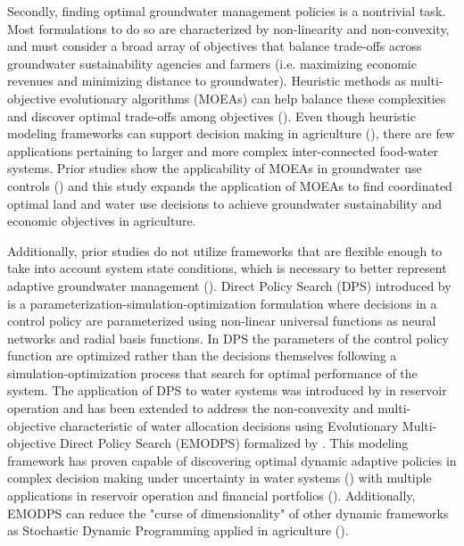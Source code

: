 \documentclass[11pt,a4paper]{article}
\begin{document}
Secondly, finding optimal groundwater management policies is a nontrivial task. Most formulations to do so are characterized by non-linearity and non-convexity, and must consider a broad array of objectives that balance trade-offs across groundwater sustainability agencies and farmers (i.e. maximizing economic revenues and minimizing distance to groundwater). Heuristic methods as multi-objective evolutionary algorithms (MOEAs) can help balance these complexities and discover optimal trade-offs among objectives (\cite{coello_evolutionary_2007}). Even though heuristic modeling frameworks can support decision making in agriculture (\cite{memmah_metaheuristics_2015}), there are few applications pertaining to larger and more complex inter-connected food-water systems. Prior studies show the applicability of MOEAs in groundwater use controls (\cite{afshar_multi-objective_2020,salehi_shafa_multi-objective_2023,habibi_davijani_optimization_2016,mehrabi_assessment_2021,banihabib_development_2019}) and this study expands the application of MOEAs to find coordinated optimal land and water use decisions to achieve groundwater sustainability and economic objectives in agriculture.  

Additionally, prior studies do not utilize frameworks that are flexible enough to take into account system state conditions,  which is necessary to better represent adaptive groundwater management (\cite{thomann_adaptive_2020}). Direct Policy Search (DPS) introduced by \textcite{rosenstein_robot_2001} is a parameterization-simulation-optimization formulation where decisions in a control policy are parameterized using non-linear universal functions as neural networks and radial basis functions. In DPS the parameters of the control policy function are optimized rather than the decisions themselves following a simulation-optimization process that search for optimal performance of the system. The application of DPS to water systems was introduced by \textcite{koutsoyiannis_evaluation_2003} in reservoir operation and has been extended to address the non-convexity and multi-objective characteristic of water allocation decisions using Evolutionary Multi-objective Direct Policy Search (EMODPS) formalized by \textcite{giuliani_coupled_2016}. This modeling framework has proven capable of discovering optimal dynamic adaptive policies in complex decision making under uncertainty in water systems (\cite{macian-sorribes_inferring_2019}) with multiple applications in reservoir operation and financial portfolios (\cite{gupta_can_2020,zatarain_salazar_balancing_2017,hamilton_stream_2022}). Additionally, EMODPS can reduce the "curse of dimensionality" of other dynamic frameworks as Stochastic Dynamic Programming applied in agriculture (\cite{taylor_dynamic_1993}). 
\end{document}
